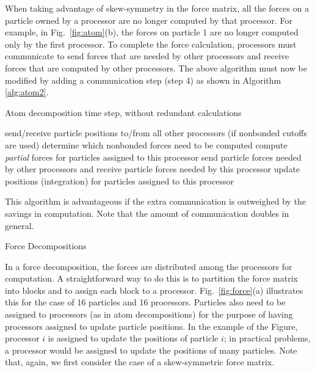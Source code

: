 When taking advantage of skew-symmetry in the force matrix,
all the forces on a particle owned by a processor are no longer computed
by that processor.  For example, in Fig.~\ref{fig:atom}(b), the forces
on particle 1 are no longer computed only by the first processor.  
To complete the force calculation,
processors must communicate to send forces that are needed by other
processors and receive forces that are computed by other processors.
The above algorithm must now be modified by adding a communication
step (step 4) as shown in Algorithm \ref{alg:atom2}.
\begin{algorithm}
\caption{Atom decomposition time step, without redundant calculations}
\label{alg:atom2}
\begin{algorithmic}[1]
\STATE send/receive particle positions to/from all other processors
\STATE (if nonbonded cutoffs are used) determine which nonbonded forces need to be computed
\STATE compute {\em partial} forces for particles assigned to this processor
\STATE send particle forces needed by other processors and receive particle forces needed by this processor
\STATE update positions (integration) for particles assigned to this processor
\end{algorithmic}
\end{algorithm}

This algorithm is advantageous if the extra communication is outweighed by
the savings in computation.  Note that the amount of communication doubles
in general.

 {Force Decompositions}

In a force decomposition, the forces are distributed among the processors
for computation.  A straightforward way to do this is to partition
the force matrix into blocks and to assign each block to a processor.
Fig.~\ref{fig:force}(a) illustrates this for the case of 16 particles
and 16 processors.  
Particles also need to be assigned to processors (as in atom decompositions)
for the purpose of having processors assigned to update particle positions.
In the example of the Figure, processor $i$ is assigned to update the
positions of particle $i$; in practical problems, a processor would 
be assigned to update the positions of many particles.
Note that, again, we first consider the case of a skew-symmetric
force matrix.  

